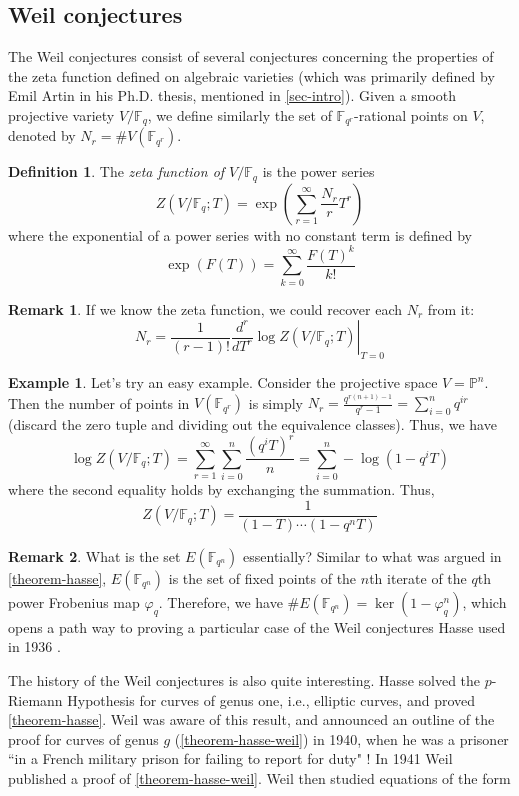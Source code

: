 \documentclass[12pt]{article}
\theoremstyle{remark}
\theoremstyle{definition}
\newtheorem{remark}{Remark}[subsection]
\newtheorem{example}{Example}[subsection]
\newtheorem{definition}{Definition}[subsection]
\newcommand{\F}[0]{\mathbb{F}}
\newcommand{\Pc}{\mathbb{P}}   %
\begin{document}
    \subsection{Weil conjectures}
        The Weil conjectures consist of several conjectures concerning the properties of the zeta function defined on algebraic varieties (which was primarily defined by Emil Artin in his Ph.D. thesis, mentioned in \autoref{sec-intro}). Given a smooth projective variety $V/\F_q$, we define similarly the set of $\F_{q^r}$-rational points on $V$, denoted by $N_r=\# V(\F_{q^r})$.
        \begin{definition}
            The \textit{zeta function of $V/\F_q$} is the power series
            \[Z(V/\F_q;T)=\exp\left(\sum_{r=1}^\infty \frac{N_r}{r}T^r\right)\]
            where the exponential of a power series with no constant term is defined by
            \[\exp(F(T))=\sum_{k=0}^\infty \frac{F(T)^k}{k!}\]
        \end{definition}
        \begin{remark}
            If we know the zeta function, we could recover each $N_r$ from it:
            \[N_r=\frac{1}{(r-1)!}\left.\frac{d^r}{dT^r}\log Z(V/\F_q;T)\right|_{T=0}\]
        \end{remark}
        \begin{example}
            Let's try an easy example. Consider the projective space $V=\Pc^n$. Then the number of points in $V(\F_{q^r})$ is simply $N_r=\frac{q^{r(n+1)-1}}{q^r-1}=\sum_{i=0}^nq^{ir}$ (discard the zero tuple and dividing out the equivalence classes). Thus, we have
            \[\log Z(V/\F_q;T)=\sum_{r=1}^\infty \sum_{i=0}^n\frac{(q^iT)^r}{n}=\sum_{i=0}^n-\log(1-q^iT)\]
            where the second equality holds by exchanging the summation. Thus,
            \[Z(V/\F_q;T)=\frac{1}{(1-T)\cdots (1-q^nT)}\]
        \end{example}
        \begin{remark}
            What is the set $E(\F_{q^n})$ essentially? Similar to what was argued in \autoref{theorem-hasse}, $E(\F_{q^n})$ is the set of fixed points of the $n$th iterate of the $q$th power Frobenius map $\varphi_{q}$. Therefore, we have $\# E(\F_{q^n})=\ker(1-\varphi_q^n)$, which opens a path way to proving a particular case of the Weil conjectures Hasse used in 1936 \cite{Hasse1936}.
        \end{remark}
        The history of the Weil conjectures is also quite interesting. Hasse solved the $p$-Riemann Hypothesis for curves of genus one, i.e., elliptic curves, and proved \autoref{theorem-hasse}. Weil was aware of this result, and announced an outline of the proof for curves of genus $g$ (\autoref{theorem-hasse-weil}) in 1940, when he was a prisoner ``in a French military prison for failing to report for duty" \cite{baez_2019_the}! In 1941 Weil published a proof of \autoref{theorem-hasse-weil}. Weil then studied equations of the form
\end{document}
